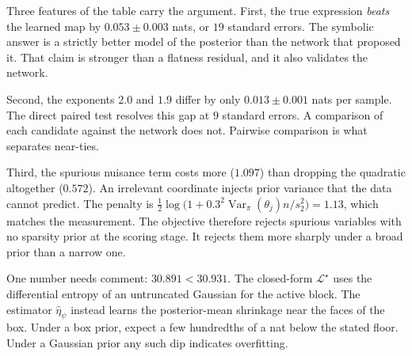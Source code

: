 \documentclass[11pt, letterpaper]{article}
\theoremstyle{definition}
\begin{document}
Three features of the table carry the argument. First, the true expression
\emph{beats} the learned map by $0.053\pm0.003$ nats, or $19$ standard errors.
The symbolic answer is a strictly better model of the posterior than the network
that proposed it. That claim is stronger than a flatness residual, and it also
validates the network.

Second, the exponents $2.0$ and $1.9$ differ by only $0.013\pm0.001$ nats per
sample. The direct paired test resolves this gap at $9$ standard errors. A
comparison of each candidate against the network does not. Pairwise comparison
is what separates near-ties.

Third, the spurious nuisance term costs more ($1.097$) than dropping the
quadratic altogether ($0.572$). An irrelevant coordinate injects prior variance
that the data cannot predict. The penalty is
$\tfrac12\log\bigl(1+0.3^2\operatorname{Var}_\pi(\theta_j)n/s_2^2\bigr)=1.13$,
which matches the measurement. The objective therefore rejects spurious
variables with no sparsity prior at the scoring stage. It rejects them more
sharply under a broad prior than a narrow one.

One number needs comment: $30.891<30.931$. The closed-form $\mathcal{L}^\star$
uses the differential entropy of an untruncated Gaussian for the active block.
The estimator $\hat\eta_\psi$ instead learns the posterior-mean shrinkage near
the faces of the box. Under a box prior, expect a few hundredths of a nat below
the stated floor. Under a Gaussian prior any such dip indicates overfitting.




\end{document}
